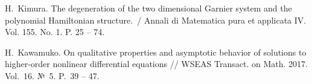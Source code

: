 
%

\begin{thebibliography}{9} %
 H.~Kimura. The degeneration of the two dimensional Garnier system and the polynomial Hamiltonian structure.~/ Annali 
di Matematica pura et applicata IV. Vol. 155. No. 1. P. 25 -- 74. 

 H.~Kawamuko. On qualitative properties and asymptotic behavior of solutions to higher-order nonlinear differential equations // 
WSEAS Transact. on Math. 2017. Vol.~16. №~5. P.~39 -- 47. 

\end{thebibliography}





%